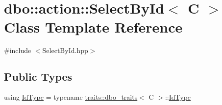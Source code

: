 \hypertarget{classdbo_1_1action_1_1_select_by_id}{\section{dbo\+:\+:action\+:\+:Select\+By\+Id$<$ C $>$ Class Template Reference}
\label{classdbo_1_1action_1_1_select_by_id}
}


{\ttfamily \#include $<$Select\+By\+Id.\+hpp$>$}

\subsection*{Public Types}
\begin{DoxyCompactItemize}
\item 
using \hyperlink{classdbo_1_1action_1_1_select_by_id_a00c65e230f8b64b90713042403032403}{Id\+Type} = typename \hyperlink{structdbo_1_1traits_1_1dbo__traits}{traits\+::dbo\+\_\+traits}$<$ C $>$\+::\hyperlink{classdbo_1_1action_1_1_select_by_id_a00c65e230f8b64b90713042403032403}{Id\+Type}
\end{DoxyCompactItemize}
